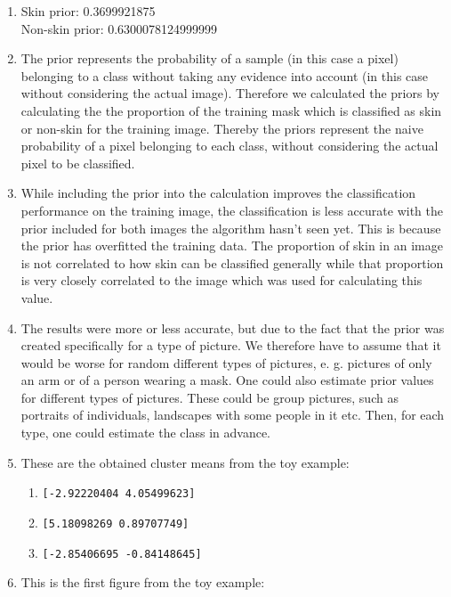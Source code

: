 \documentclass[11pt]{article}
\begin{document}
\begin{enumerate}[1.]
	\item Skin prior: 0.3699921875\\Non-skin prior: 0.6300078124999999
	\item The prior represents the probability of a sample (in this case a pixel) belonging to a class without taking any evidence into account (in this case without considering the actual image). Therefore we calculated the priors by calculating the the proportion of the training mask which is classified as skin or non-skin for the training image. Thereby the priors represent the naive probability of a pixel belonging to each class, without considering the actual pixel to be classified. 
	\item While including the prior into the calculation improves the classification performance on the training image, the classification is less accurate with the prior included for both images the algorithm hasn't seen yet. This is because the prior has overfitted the training data. The proportion of skin in an image is not correlated to how skin can be classified generally while that proportion is very closely correlated to the image which was used for calculating this value.
	\item The results were more or less accurate, but due to the fact that the prior was created specifically for a type of picture. We therefore have to assume that it would be worse for random different types of pictures, e. g. pictures of only an arm or of a person wearing a mask. One could also estimate prior values for different types of pictures. These could be group pictures, such as portraits of individuals, landscapes with some people in it etc. Then, for each type, one could estimate the class in advance.
	\item These are the obtained cluster means from the toy example:
	\begin{enumerate}[Cluster 1:]
		\item \texttt{[-2.92220404  4.05499623]}
		\item \texttt{[5.18098269 0.89707749]}
		\item \texttt{[-2.85406695 -0.84148645]}
	\end{enumerate}
	\item This is the first figure from the toy example:
	

\end{enumerate}
\end{document}
